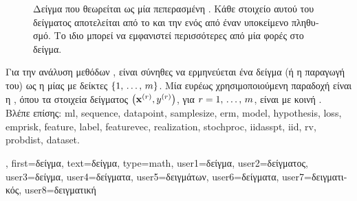 {{\begin{figure}[H]
\begin{center}
\begin{tikzpicture}[>=Latex, font=\small]
 			\end{tikzpicture}
 		\end{center}
 		{
		\caption{\foreignlanguage{greek}{Δείγμα που θεωρείται ως μία πεπερασμένη} . 
			\foreignlanguage{greek}{Κάθε στοιχείο αυτού του δείγματος αποτελείται από το}  
			\foreignlanguage{greek}{και την}  \foreignlanguage{greek}{ενός}  
			\foreignlanguage{greek}{από έναν υποκείμενο πληθυσμό. Το ιδιο}  \foreignlanguage{greek}{μπορεί 
			να εμφανιστεί περισσότερες από μία φορές στο δείγμα.}
 			\label{fig:sample-sequence_dict}} }
 		\end{figure} 	
 		\foreignlanguage{greek}{Για την ανάλυση μεθόδων} , \foreignlanguage{greek}{είναι σύνηθες να ερμηνεύ\-εται 
		ένα δείγμα (ή η παραγωγή του) ως η}  \foreignlanguage{greek}{μίας}  
		\foreignlanguage{greek}{με δείκτες} $\{1,\,\ldots,\,m\}$. \foreignlanguage{greek}{Μία ευρέως χρησιμοποιούμενη 
		παραδοχή είναι η} , \foreignlanguage{greek}{όπου τα στοιχεία δείγματος 
		$\left( {\bf x}^{(r)},y^{(r)} \right)$, για $r=1,\,\ldots,\,m$, είναι}  
		 \foreignlanguage{greek}{με κοινή} .  
		\\
		\foreignlanguage{greek}{Βλέπε επίσης:} \gls{ml}, \gls{sequence}, \gls{datapoint}, \gls{samplesize}, \gls{erm}, \gls{model}, 
		\gls{hypothesis}, \gls{loss}, \gls{emprisk}, \gls{feature}, \gls{label}, \gls{featurevec}, \gls{realization}, \gls{stochproc}, \gls{iidasspt}, 
		\gls{iid}, \gls{rv}, \gls{probdist}, \gls{dataset}.},
	first={\foreignlanguage{greek}{δείγμα}},
	text={\foreignlanguage{greek}{δείγμα}},
	type=math,
	user1={\foreignlanguage{greek}{δείγμα}}, %
	user2={\foreignlanguage{greek}{δείγματος}}, %
	user3={\foreignlanguage{greek}{δείγμα}}, %
	user4={\foreignlanguage{greek}{δείγματα}}, %
	user5={\foreignlanguage{greek}{δειγμάτων}}, %
	user6={\foreignlanguage{greek}{δείγματα}}, %
	user7={\foreignlanguage{greek}{δειγματικός}}, %
	user8={\foreignlanguage{greek}{δειγματική}} %
}

